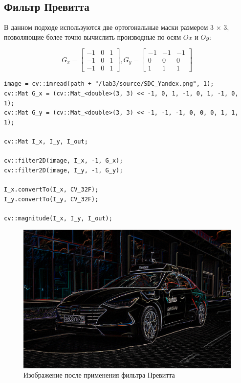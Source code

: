 \pagebreak

\subsection{Фильтр Превитта}

В данном подходе используются две ортогональные маски размером 3 × 3, позволяющие более точно вычислить производные по
осям $Ox$ и $Oy$:

\begin{equation}
    G_x = \begin{bmatrix}
        -1 & 0 & 1 \\
        -1 & 0 & 1 \\
        -1 & 0 & 1
    \end{bmatrix}, 
    G_y = \begin{bmatrix}
        -1 & -1 & -1 \\
        0 & 0 & 0 \\
        1 & 1 & 1
    \end{bmatrix}
\end{equation}

\begin{lstlisting}[style=cpp_white, caption={Исходный код фильтра Превитта}]
image = cv::imread(path + "/lab3/source/SDC_Yandex.png", 1);
cv::Mat G_x = (cv::Mat_<double>(3, 3) << -1, 0, 1, -1, 0, 1, -1, 0, 1);
cv::Mat G_y = (cv::Mat_<double>(3, 3) << -1, -1, -1, 0, 0, 0, 1, 1, 1);

cv::Mat I_x, I_y, I_out;

cv::filter2D(image, I_x, -1, G_x);
cv::filter2D(image, I_y, -1, G_y);

I_x.convertTo(I_x, CV_32F);
I_y.convertTo(I_y, CV_32F);

cv::magnitude(I_x, I_y, I_out);
\end{lstlisting}

\begin{figure}[ht]
    \centering
    \includegraphics[width=\textwidth]{../outputs/previt_operator.png}
    \caption{Изображение после применения фильтра Превитта}
    \label{fig:stitch_images}
\end{figure}

